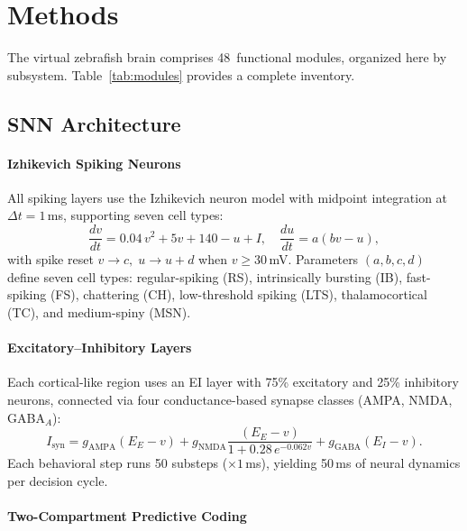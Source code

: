 \documentclass[12pt]{article}
\begin{document}
\section{Methods}\label{sec:methods}

The virtual zebrafish brain comprises 48~functional modules,
organized here by subsystem.
Table~\ref{tab:modules} provides a complete inventory.

\subsection{SNN Architecture}\label{sec:snn}

\paragraph{Izhikevich Spiking Neurons}

All spiking layers use the Izhikevich neuron model \citep{izhikevich2003}
with midpoint integration at $\Delta t = 1$\,ms, supporting seven cell
types:
\begin{equation}\label{eq:izhikevich}
  \frac{dv}{dt} = 0.04\,v^2 + 5v + 140 - u + I, \quad
  \frac{du}{dt} = a(bv - u),
\end{equation}
with spike reset $v \to c,\; u \to u + d$ when $v \ge 30$\,mV.
Parameters $(a,b,c,d)$ define seven cell types:
regular-spiking (RS), intrinsically bursting (IB),
fast-spiking (FS), chattering (CH), low-threshold spiking (LTS),
thalamocortical (TC), and medium-spiny (MSN).

\paragraph{Excitatory--Inhibitory Layers}

Each cortical-like region uses an EI layer with 75\% excitatory
and 25\% inhibitory neurons, connected via four
conductance-based synapse classes (AMPA, NMDA, GABA$_A$):
\begin{equation}
  I_\text{syn} = g_\text{AMPA}(E_E - v)
    + g_\text{NMDA}\frac{(E_E - v)}{1 + 0.28\,e^{-0.062v}}
    + g_\text{GABA}(E_I - v).
\end{equation}
Each behavioral step runs 50 substeps ($\times 1$\,ms), yielding
50\,ms of neural dynamics per decision cycle.

\paragraph{Two-Compartment Predictive Coding}
\end{document}
